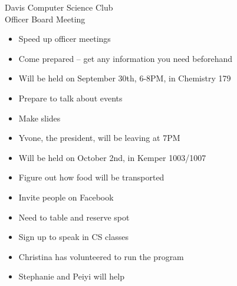 \documentclass{article}
\begin{document}
\begin{Minutes}{Davis Computer Science Club\\Officer Board Meeting}





\maketitle
{} 
\begin{itemize}
\item  Speed up officer meetings
\item  Come prepared -- get any information you need beforehand
\end{itemize}

\begin{itemize}
\item Will be held on September 30th, 6-8PM, in Chemistry 179
\item Prepare to talk about events
\item Make slides
\item Yvone, the president, will be leaving at 7PM
\end{itemize}

\begin{itemize}
\item Will be held on October 2nd, in Kemper 1003/1007
\item Figure out how food will be transported
\item Invite people on Facebook
\end{itemize}

\begin{itemize}
\item Need to table and reserve spot
\item Sign up to speak in CS classes
\end{itemize}

\begin{itemize}
\item Christina has volunteered to run the program
\item Stephanie and Peiyi will help
\end{itemize}


\end{Minutes}
\end{document}
